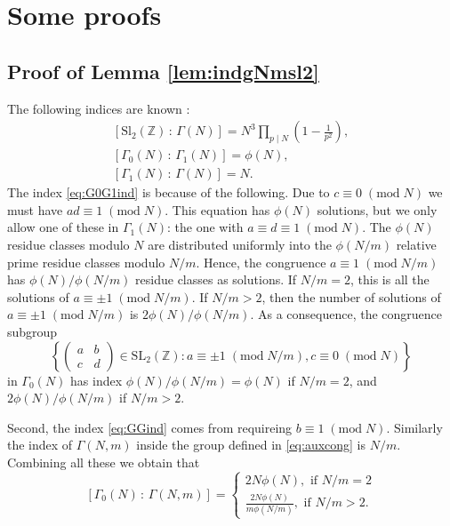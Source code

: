 \documentclass{article}
\theoremstyle{definition}
\newcommand{\ZZ} {{\mathbb Z}}		%
\begin{document}
\appendix
\section{Some proofs}
\subsection{Proof of Lemma \ref{lem:indgNmsl2}}
\label{sec:app0}

The following indices are known \cite[Section 1.2]{diamond2005first}:
\begin{gather}
\label{eq:GGind} [\mathrm{Sl}_2(\ZZ) \, : \, \Gamma(N)] = N^3 \prod_{p \mid N}\left(1-\frac{1}{p^2} \right), \\
\label{eq:G0G1ind} [\Gamma_0(N) \, : \, \Gamma_1(N) ]= \phi(N), \\
\label{eq:GGind} [\Gamma_1(N) \, : \, \Gamma(N) ]= N.
\end{gather}
The index \eqref{eq:G0G1ind} is because of the following. Due to $c \equiv 0 \;( \mathrm{mod}\;N)$ we must have $ad\equiv 1 \;( \mathrm{mod}\;N)$. This equation has $\phi(N)$ solutions, but we only allow one of these in $\Gamma_1(N)$: the one with $a\equiv d\equiv 1 \;(\mathrm{mod}\;N)$. The $\phi(N)$ residue classes modulo $N$ are distributed uniformly into the $\phi(N/m)$ relative prime residue classes modulo $N/m$. Hence, the congruence $a \equiv 1 \;( \mathrm{mod}\;N/m)$ has $\phi(N)/\phi(N/m)$ residue classes as solutions. If $N/m=2$, this is all the solutions of $a \equiv \pm 1 \;( \mathrm{mod}\;N/m)$. If $N/m>2$, then the number of solutions of $a \equiv \pm 1 \;( \mathrm{mod}\;N/m)$ is $2\phi(N)/\phi(N/m)$. As a consequence, the congruence subgroup
\begin{equation}  \left\{ \begin{pmatrix} a & b \\ c & d \end{pmatrix} \in \mathrm{SL}_2(\ZZ): a \equiv \pm 1 \;(\mathrm{mod}\;N/m), c \equiv 0 \;(\mathrm{mod}\;N) \right\} 
\label{eq:auxcong}
\end{equation}
in $\Gamma_0(N)$ has index $\phi(N)/\phi(N/m)=\phi(N)$ if $N/m=2$, and $2\phi(N)/\phi(N/m)$ if $N/m>2$.

Second, the index \eqref{eq:GGind} comes from requireing $b \equiv 1 \;( \mathrm{mod}\;N)$. Similarly the index of $\Gamma(N,m)$ inside the group defined in \eqref{eq:auxcong} is $N/m$. Combining all these we obtain that 
\[ [\Gamma_0(N) \, : \, \Gamma(N,m) ]= \begin{cases}
2N \phi(N), \textrm{ if } N/m =2 \\
\frac{2N \phi(N)}{m \phi(N/m)}, \textrm{ if } N/m >2.
\end{cases} \]
\end{document}
